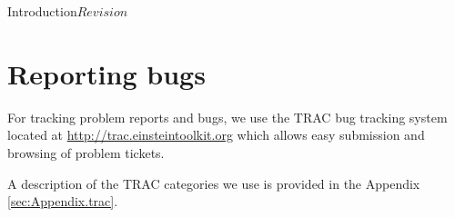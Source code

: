 \begin{cactuspart}{Introduction}{}{$Revision$}

\chapter{Reporting bugs}
\label{sec:gehe}

For tracking problem reports and bugs, we use the TRAC bug tracking
system located at \url{http://trac.einsteintoolkit.org} which allows
easy submission and browsing of problem tickets.

A description of the TRAC categories we use is provided in the Appendix
\ref{sec:Appendix.trac}.




\end{cactuspart}
